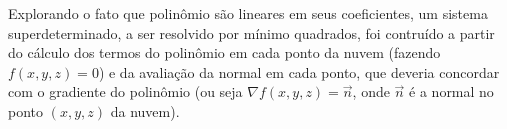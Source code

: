 Explorando o fato que polinômio são lineares em seus coeficientes, um sistema
superdeterminado, a ser resolvido por mínimo quadrados, foi contruído a partir
do cálculo dos termos do polinômio em cada ponto da nuvem (fazendo $f(x,y,z)=0$)
e da avaliação da normal em cada ponto, que deveria concordar com o gradiente do
polinômio (ou seja $\nabla f(x,y,z) = \overrightarrow{n}$, onde $\overrightarrow{n}$ é a normal no ponto $(x,y,z)$ da nuvem).



% 



